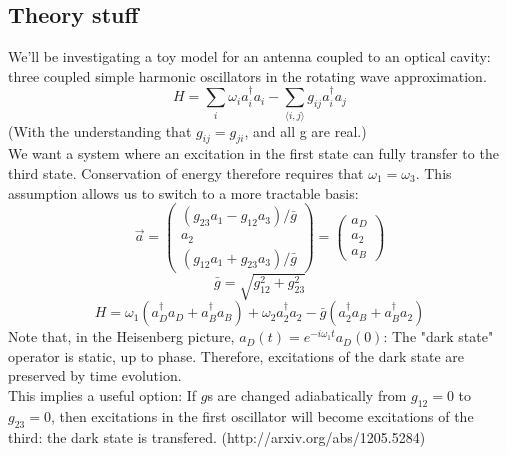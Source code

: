 \documentclass[final]{article}
\begin{document}
\subsection*{Theory stuff}
We'll be investigating a toy model for an antenna coupled to an optical cavity: three coupled simple harmonic oscillators in the rotating wave approximation.
\[H=\sum_i \omega_i a_i^\dagger a_i-\sum_{\langle i,j\rangle} g_{ij} a_i^\dagger a_j\]
(With the understanding that \(g_{ij}=g_{ji}\), and all g are real.)\\
We want a system where an excitation in the first state can fully transfer to the third state. Conservation of energy therefore requires that \(\omega_1=\omega_3\).
This assumption allows us to switch to a more tractable basis:
\[\vec a=\begin{pmatrix}(g_{23}a_1-g_{12}a_3)/\bar g\\a_2\\(g_{12}a_1+g_{23}a_3)/\bar g\end{pmatrix}=\begin{pmatrix}a_D\\a_2\\a_B\end{pmatrix}\]
\[\bar g=\sqrt{g_{12}^2+g_{23}^2}\]
\[H=\omega_1\left(a_D^\dagger a_D+a_B^\dagger a_B\right)+\omega_2a_2^\dagger a_2-\bar g\left(a_2^\dagger a_B+a_B^\dagger a_2\right)\]
Note that, in the Heisenberg picture, \(a_D(t)=e^{-i\omega_1 t} a_D(0)\): The "dark state" operator is static, up to phase. Therefore, excitations of the dark state are preserved by time evolution.\\
This implies a useful option: If \(g\)s are changed adiabatically from \(g_{12}=0\) to \(g_{23}=0\), then excitations in the first oscillator will become excitations of the third: the dark state is transfered. (http://arxiv.org/abs/1205.5284)
\end{document}
